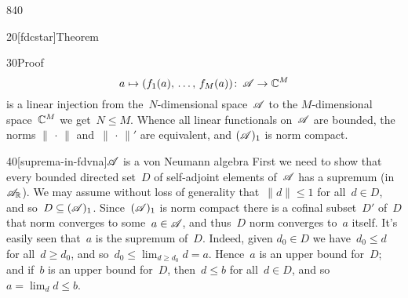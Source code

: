 \begin{parsec}{840}
\begin{point}{20}[fdcstar]{Theorem}
\begin{point}{30}{Proof}
\begin{equation*}
a\mapsto (f_1(a),\,\dotsc,\,f_M(a))\colon\,
\mathscr{A}\to\mathbb{C}^M
\end{equation*}
is a linear injection
from the~$N$-dimensional
space~$\mathscr{A}$ to the $M$-dimensional space~$\mathbb{C}^M$
we get~$N\leq M$.
Whence all linear functionals on~$\mathscr{A}$
are bounded, the norms $\|\,\cdot\,\|$ and~$\|\,\cdot\,\|'$
are equivalent,
and $(\mathscr{A})_1$
is norm compact.
\begin{point}{40}[suprema-in-fdvna]{$\mathscr{A}$ is a von Neumann algebra}%
First we need to show that every bounded directed
set~$D$ of self-adjoint elements
of~$\mathscr{A}$ has a supremum (in $\mathscr{A}_{\mathbb{R}}$).
We may assume without loss of generality that~$\|d\|\leq 1$
for all~$d\in D$, and so~$D\subseteq (\mathscr{A})_1$.
Since~$(\mathscr{A})_1$
is norm compact
there is a cofinal subset~$D'$ of~$D$
that norm converges to some~$a\in\mathscr{A}$,
and thus~$D$ norm converges to~$a$ itself.
It's easily seen that~$a$ is the supremum of~$D$.
Indeed, given $d_0\in D$
we have~$d_0\leq d$ for all~$d\geq d_0$,
and so~$d_0\leq \lim_{d\geq d_0} d=a$.
Hence~$a$ is an upper bound for~$D$;
and if~$b$ is an upper bound for~$D$,
then~$d\leq b$ for all~$d\in D$, and so $a=\lim_d d \leq  b$.


\end{point}
\end{point}
\end{point}
\end{parsec}
